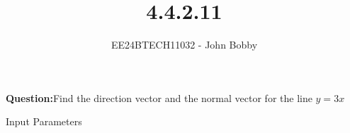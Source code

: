 \documentclass[journal]{IEEEtran}
\begin{document}

\vspace{3cm}
\title{4.4.2.11}
\author{EE24BTECH11032 - John Bobby}
{\let\newpage\relax\maketitle}

\renewcommand{\thefigure}{\theenumi}
\renewcommand{\thetable}{\theenumi}
\setlength{\intextsep}{10pt} %


\renewcommand{\thetable}{\theenumi}


\textbf{Question:}Find the direction vector and the normal vector for the line $y=3x$\\

\begin{table}[h!]    
  \centering
  
  \caption{Input Parameters}
  \label{tab4.4.2.11}
\end{table}
\end{document}
